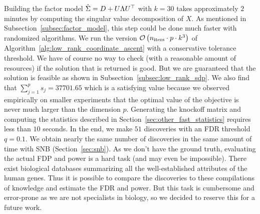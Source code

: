 Building the factor model $\hat{\Sigma} = D + U \Lambda U^\top$ with $k = 30$ takes approximately $2$ minutes
by computing the singular value decomposition of $X$.
As mentioned in Subsection~\ref{subsec:factor_model},
this step could be done much faster with randomized algorithms.
We run the version $\mathcal{O}\left( n_\text{iters} \cdot p \cdot k^3 \right)$
of Algorithm~\ref{alg:low_rank_coordinate_ascent} with a conservative tolerance threshold.
We have of course no way to check (with a reasonable amount of resources) if the solution that is returned is good.
But we are guaranteed that the solution is feasible as shown in Subsection~\ref{subsec:low_rank_sdp}.
We also find that $\sum_{j = 1}^p s_j = 37701.65$ which is a satisfying value because
we observed empirically on smaller experiments that
the optimal value of the objective is never much larger than the dimension $p$.
Generating the knockoff matrix and computing the statistics described in Section~\ref{sec:other_fast_statistics}
requires less than $10$ seconds.
In the end, we make $51$ discoveries with an FDR threshold $q = 0.1$.
We obtain nearly the same number of discoveries in the same amount of time with SNB (Section~\ref{sec:snb}).
As we don't have the ground truth,
evaluating the actual FDP and power is a hard task (and may even be impossible).
There exist biological databases summarizing all the well-established attributes of the human genes.
Thus it is possible to compare the discoveries to these compilations of knowledge
and estimate the FDR and power.
But this task is cumbersome and error-prone as we are not specialists in biology,
so we decided to reserve this for a future work.
